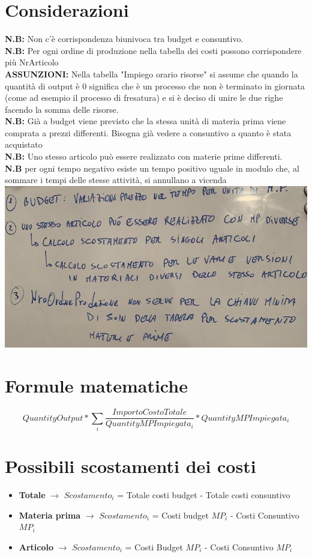 \documentclass{article}
\begin{document}
\section{Considerazioni}
\textbf{N.B:} Non c’è corrispondenza biunivoca tra budget e consuntivo.
\\\textbf{N.B:} Per ogni ordine di produzione nella tabella dei costi possono corrispondere più NrArticolo
\\\textbf{ASSUNZIONI:} Nella tabella "Impiego orario risorse" si assume che quando la quantità di output è 0 significa che è un processo che non è terminato in giornata (come ad esempio il 
processo di fresatura) e si è deciso di unire le due righe facendo la somma delle risorse.
\\\textbf{N.B:} Già a budget viene previsto che la stessa unità di materia prima viene comprata a prezzi differenti. Bisogna già vedere a consuntivo a quanto è stata acquistato
\\\textbf{N.B:} Uno stesso articolo può essere realizzato con materie prime differenti.
\\\textbf{N.B} per ogni tempo negativo esiste un tempo positivo uguale in modulo che, al sommare i tempi delle stesse attività, si annullano a vicenda
\\\includegraphics[scale = 0.4]{Lavagnetta.jpg}

\section{Formule matematiche}

$$QuantityOutput*\sum_{i}\frac{ImportoCostoTotale}{QuantityMPImpiegata_{i}}*QuantityMPImpiegata_{i}$$
\section{Possibili scostamenti dei costi}
\begin{itemize} 
    \item \textbf{Totale} $\rightarrow$  $Scostamento_{i}$ = Totale costi budget - Totale costi consuntivo
    \item \textbf{Materia prima} $\rightarrow$ $Scostamento_{i}$ = Costi budget $MP_{i}$ - Costi Consuntivo $MP_{i}$
    \item \textbf{Articolo} $\rightarrow$  $Scostamento_{i}$ = Costi Budget $MP_{i}$ - Costi Consuntivo $MP_{i}$
\end{itemize}
\end{document}

